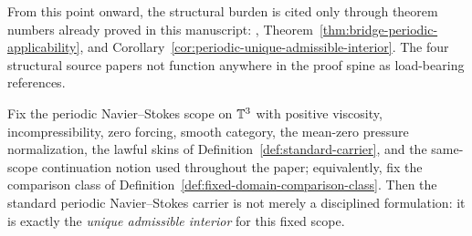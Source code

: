 \begin{remark}\label{rem:carrier-packet-citation-discipline}
From this point onward, the structural burden is cited only through theorem numbers already proved in this manuscript: \StructuralPacketRef{}, Theorem~\ref{thm:bridge-periodic-applicability}, and Corollary~\ref{cor:periodic-unique-admissible-interior}. The four structural source papers not function anywhere in the proof spine as load-bearing references.
\end{remark}

\begin{manualtheorem}
\label{thm:periodic-carrier-unique-interior}
Fix the periodic Navier--Stokes scope on $\mathbb{T}^3$ with positive viscosity, incompressibility, zero
forcing, smooth category, the mean-zero pressure normalization, the lawful skins of
Definition~\ref{def:standard-carrier}, and the same-scope continuation notion used throughout the
paper; equivalently, fix the comparison class of Definition~\ref{def:fixed-domain-comparison-class}. Then the standard periodic Navier--Stokes carrier is not merely a disciplined formulation: it
is exactly the \emph{unique admissible interior} for this fixed scope.
\end{manualtheorem}

